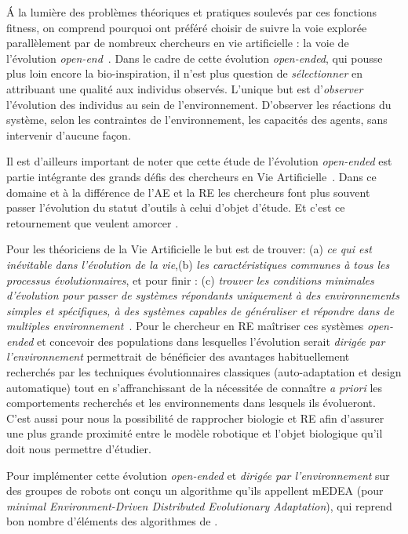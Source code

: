 \'A la lumière des problèmes théoriques et pratiques soulevés par ces fonctions fitness, on comprend pourquoi \cite{bredeche2012environmentdrivenopenende} ont préféré choisir de suivre la voie explorée parallèlement par de nombreux chercheurs en vie artificielle : la voie de l'évolution \emph{open-end}~\citep{ray91anapproachtothesynthesisoflife,adami94evolutionarylearninginthe2Dartificiallifesystemavida}. Dans le cadre de cette évolution \emph{open-ended}, qui pousse plus loin encore la bio-inspiration, il n'est plus question de \emph{sélectionner} en attribuant une qualité aux individus observés. L'unique but est d'\emph{observer} l'évolution des individus au sein de l'environnement. D'observer les réactions du système, selon les contraintes de l'environnement, les capacités des agents, sans intervenir d'aucune fa\c con.

Il est d'ailleurs important de noter que cette étude de l'évolution \emph{open-ended} est partie intégrante des grands défis des chercheurs en Vie Artificielle~\citep{bedau2000openproblemsinartificiallife}. Dans ce domaine et à la différence de l'AE et la RE les chercheurs font plus souvent passer l'évolution du statut d'outils à celui d'objet d'étude. Et c'est ce retournement que veulent amorcer \cite{bredeche11mcmds}.

Pour les théoriciens de la Vie Artificielle le but est de trouver: (a) \emph{ce qui est inévitable dans l'évolution de la vie},(b) \emph{les caractéristiques communes à tous les processus évolutionnaires}, et pour finir : (c) \emph{trouver les conditions minimales d'évolution pour passer de systèmes répondants uniquement à des environnements simples et spécifiques, à des systèmes capables de généraliser et répondre dans de multiples environnement}~\citep[voir respectivement les chapitres 3.6, 3.10 et 3.7 ]{bedau2000openproblemsinartificiallife}.
Pour le chercheur en RE maîtriser ces systèmes \emph{open-ended} et concevoir des populations dans lesquelles l'évolution serait \emph{dirigée par l'environnement} permettrait de bénéficier des avantages habituellement recherchés par les techniques évolutionnaires classiques (auto-adaptation et design automatique) tout en s'affranchissant de la nécessitée de connaître \emph{a priori} les comportements recherchés et les environnements dans lesquels ils évolueront. C'est aussi pour nous la possibilité de rapprocher biologie et RE afin d'assurer une plus grande proximité entre le modèle robotique et l'objet biologique qu'il doit nous permettre d'étudier.

Pour implémenter cette évolution \emph{open-ended} et \emph{dirigée par l'environnement} sur des groupes de robots \cite{bredeche11mcmds} ont conçu un algorithme qu'ils appellent mEDEA (pour \emph{minimal Environment-Driven Distributed Evolutionary Adaptation}), qui reprend bon nombre d'éléments des algorithmes de \cite{watson02embodiedevolutiondistributingevolutionaryalgorithmpopulationrobots}.

